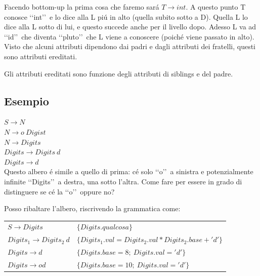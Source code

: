 Facendo bottom-up la prima cosa che faremo sar\'a $T \rightarrow int$. A questo punto T conosce \lq\lq int\rq\rq\ e lo dice alla L pi\'u in alto (quella subito sotto a D).
Quella L lo dice alla L sotto di lui, e questo succede anche per il livello dopo. Adesso L va ad \lq\lq id\rq\rq\ che diventa \lq\lq pluto\rq\rq\, che L viene a conoscere
(poich\'e viene passato in alto). Visto che alcuni attributi dipendono dai padri e dagli attributi dei fratelli, questi sono attributi ereditati.

Gli attributi ereditati sono funzione degli attributi di siblings e del padre.

\subsection{Esempio}
$S \rightarrow N$\\
$N \rightarrow o\ Digist$\\
$N \rightarrow Digits$\\
$Digits \rightarrow Digits\ d$\\
$Digits \rightarrow d$\\

Questo albero \'e simile a quello di prima: c\'e solo \lq\lq o\rq\rq\ a sinistra e potenzialmente infinite \lq\lq Digits\rq\rq\ a destra, una sotto l'altra.
Come fare per essere in grado di distinguere se c\'e la \lq\lq o\rq\rq\ oppure no?

Posso ribaltare l'albero, riscrivendo la grammatica come:\\
\begin{tabular}{ll}
	$S \rightarrow Digits$ 	&	$\{ Digits.qualcosa \}$\\
	$Digits_1 \rightarrow Digits_2 \ d $ 	&	$\{ Digits_1.val = Digits_2.val * Digits_2.base + 'd' \}$\\
	$Digits \rightarrow d $ 	&	$\{ Digits.base = 8;\ Digits.val = 'd' \}$\\
	$Digits \rightarrow od $ 	&	$\{ Digits.base = 10;\ Digits.val = 'd' \}$\\
\end{tabular}
